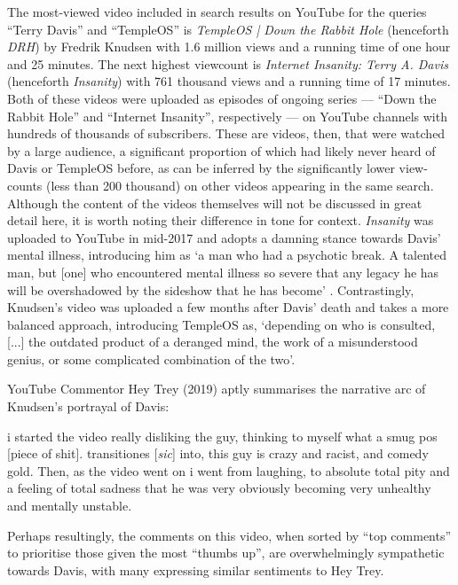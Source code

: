 \documentclass[Draft.tex]{subfiles}
\begin{document}
The most-viewed video included in search results on YouTube
for the queries ``Terry Davis'' and ``TempleOS'' is
\textit{TempleOS | Down the Rabbit Hole} (henceforth \textit{DRH})
by Fredrik Knudsen with 1.6 million views
and a running time of one hour and 25 minutes.
The next highest viewcount is \textit{Internet Insanity: Terry A. Davis}
(henceforth \textit{Insanity}) with 761 thousand views and a running time of 17 minutes.
Both of these videos were uploaded as episodes of ongoing series
--- ``Down the Rabbit Hole'' and ``Internet Insanity'', respectively ---
on YouTube channels with hundreds of thousands of subscribers.
These are videos, then, that were watched by a large audience,
a significant proportion of which had likely never heard of Davis
or TempleOS before, as can be inferred
by the significantly lower view-counts (less than 200 thousand)
on other videos appearing in the same search.
Although the content of the videos themselves
will not be discussed in great detail here,
it is worth noting their difference in tone for context.
\textit{Insanity} was uploaded to YouTube in mid-2017 and adopts a damning stance
towards Davis' mental illness, introducing him as
`a man who had a psychotic break.
A talented man, but [one] who encountered mental illness so severe
that any legacy he has will be overshadowed
by the sideshow that he has become' \parencite*{Metokur17}.
Contrastingly, Knudsen's \parencite*{Knudsen18} video
was uploaded a few months after Davis' death and
takes a more balanced approach, introducing TempleOS as,
`depending on who is consulted, [...] the outdated product of a deranged mind,
the work of a misunderstood genius, or some complicated combination of the two'.

YouTube Commentor Hey Trey (2019) aptly summarises
the narrative arc of Knudsen's portrayal of Davis:
\begin{displayquote}
	i started the video really disliking the guy,
	thinking to myself what a smug pos [piece of shit].
	transitiones [\textit{sic}] into, this guy is crazy and racist, and comedy gold.
	Then, as the video went on i went from laughing, to absolute total pity
	and a feeling of total sadness that he was very obviously
	becoming very unhealthy and mentally unstable.\footnotemark
\end{displayquote}
Perhaps resultingly, the comments on this video, when sorted by ``top comments''
to prioritise those given the most ``thumbs up'',
are overwhelmingly sympathetic towards Davis, with many expressing similar
sentiments to Hey Trey.
\end{document}
